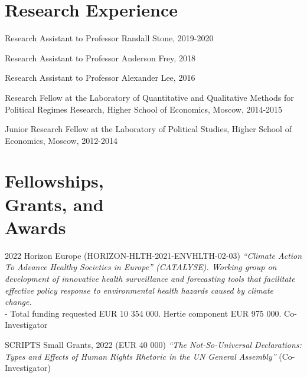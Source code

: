 \documentclass[margin,line,11pt]{res}
\begin{document}
\begin{resume}






\section{\sc Research Experience}

Research Assistant to Professor Randall Stone, 2019-2020 

\vspace*{-4.5mm}
Research Assistant to Professor Anderson Frey, 2018

\vspace*{-4.5mm}
Research Assistant to Professor Alexander Lee, 2016

\vspace*{-4.5mm}
Research Fellow at the Laboratory of Quantitative and Qualitative Methods 
for Political Regimes Research, Higher School of Economics, Moscow, 2014-2015 

\vspace*{-4.5mm}
Junior Research Fellow at the Laboratory of Political Studies, Higher School of Economics, Moscow, 2012-2014 

\section{\sc Fellowships,   \\ Grants,  and  \\Awards}

2022 Horizon Europe (HORIZON-HLTH-2021-ENVHLTH-02-03) \textit{“Climate Action To Advance Healthy Societies in Europe” (CATALYSE). Working group on development of innovative health surveillance and forecasting tools that facilitate effective policy response to environmental health hazards caused by climate change.} 
\\
- Total funding requested EUR 10 354 000. Hertie component EUR 975 000. Co-Investigator

\vspace*{-3.5mm}

SCRIPTS Small Grants, 2022 (EUR 40 000) \textit{“The Not-So-Universal Declarations: Types and Effects of Human Rights Rhetoric in the UN General Assembly”} (Co-Investigator)


\end{resume}
\end{document}
